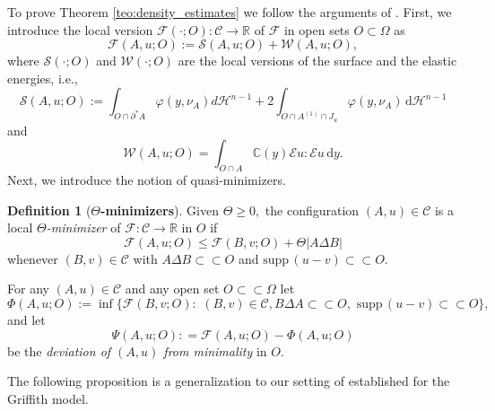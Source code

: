 \documentclass[reqno]{amsart}
\numberwithin{equation}{section}
\theoremstyle{plain}
\theoremstyle{definition}
\newtheorem{definition}[theorem]{Definition}
\newcommand{\C}{\mathbb{C}}
\newcommand{\R}{\mathbb{R}}
\newcommand{\cH}{\mathcal{H}}
\newcommand{\cS}{\mathcal{S}}
\newcommand{\cF}{\mathcal{F}}
\newcommand{\cW}{\mathcal{W}}
\newcommand{\p}{\partial}
\renewcommand{\d}{\mathrm{d}}
\newcommand{\strictlyincluded}{\subset\subset}
\newcommand{\supp}{\mathrm{supp}\,}
\newcommand{\openset}{O}
\newcommand{\str}[1]{\mathcal{E}#1}
\newcommand{\admissible}{\mathcal{C}}
\begin{document}
To prove Theorem \ref{teo:density_estimates} we follow the arguments of \cite[Section 3]{HP:2021_arxiv}.  First, we introduce the local version $\cF(\cdot;\openset):\admissible\to\R$ of $\cF$ in open sets  $\openset\subset\Omega$ as
\begin{equation}\label{local_cF}
\cF(A,u;\openset):=\cS(A,u;\openset) + 
\cW(A,u; \openset), 
\end{equation}
%
where $\cS(\cdot;\openset)$ and $\cW(\cdot; \openset)$ are the local versions of the surface and the elastic energies, i.e.,
$$
\cS(A,u;\openset):= \int_{\openset \cap \p^*A} \varphi(y,\nu_A)d\cH^{n-1} 
+ 2\int_{\openset \cap A^{(1)}\cap J_u} \varphi(y,\nu_A)\,\d\cH^{n-1}  
$$
and 
$$
\cW(A,u; \openset) = \int_{\openset\cap A} \C(y)\str{u}:\str{u}\, \d y. 
$$
Next, we introduce the notion of quasi-minimizers.
%
\begin{definition}[\textbf{$\Theta$-minimizers}]
Given $\Theta\ge 0,$ the configuration $(A,u)\in\admissible $
is a local {\it $\Theta$-minimizer} of $\cF:\admissible \to\R$ in $\openset$ if
\begin{equation*} 
\cF(A,u;\openset) \le \cF(B,v;\openset) + \Theta|A\Delta B|
\end{equation*}
whenever $(B,v)\in\admissible $ with $A\Delta B\strictlyincluded \openset$ and $\supp(u-v)\strictlyincluded \openset.$
\end{definition}


For any $(A,u)\in\admissible $ and any open set $\openset \strictlyincluded \Omega$ let 
\begin{equation}\label{minimal_with_dirixle}
\Phi(A,u;\openset):= 
\inf\Big\{ 
\cF(B,v;\openset):\,\, (B,v)\in\admissible,
B\Delta A\strictlyincluded \openset,\,\, 
\supp (u-v)\strictlyincluded \openset 
\Big\},
\end{equation}
%
 and let 
\begin{equation}\label{deviation}
\Psi(A,u;\openset): = \cF(A,u;\openset) - \Phi(A,u;\openset) 
\end{equation}
%
be the \emph{deviation of $(A,u)$ from minimality} in $\openset.$ 
 
%
The following proposition is a generalization to our setting of 
\cite[Theorem 4]{CCI:2017} established for the Griffith model. 
\end{document}
